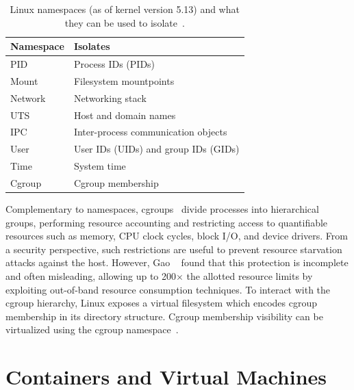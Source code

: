 \begin{table}
\begin{tabular}{lp{3in}}
    \toprule
    Namespace & Isolates \\
    \midrule
    \multirow{1}{*}{PID} & Process IDs (PIDs)\\
    \multirow{1}{*}{Mount} & Filesystem mountpoints\\
    \multirow{1}{*}{Network} & Networking stack\\
    \multirow{1}{*}{UTS} & Host and domain names\\
    \multirow{1}{*}{IPC} & Inter-process communication objects\\
    \multirow{1}{*}{User} & User IDs (UIDs) and group IDs (GIDs)\\
    \multirow{1}{*}{Time} & System time\\
    \multirow{1}{*}{Cgroup} & Cgroup membership\\
    \bottomrule
\end{tabular}
\caption{Linux namespaces (as of kernel version 5.13) and what they can be used to isolate~\cite{linux_namespaces}.}
\label{tab:namespaces}
\end{table}

Complementary to namespaces, cgroups~\cite{cgroups, gao2019_houdini} divide processes into hierarchical
groups, performing resource accounting and restricting access to quantifiable resources
such as memory, CPU clock cycles, block I/O, and device drivers. From a security
perspective, such restrictions are useful to prevent resource starvation attacks against
the host. However, Gao \etal~\cite{gao2019_houdini} found that this protection is
incomplete and often misleading, allowing up to 200$\times$ the allotted resource limits
by exploiting out-of-band resource consumption techniques. To interact with the cgroup hierarchy,
Linux exposes a virtual filesystem which encodes cgroup membership in its directory structure.
Cgroup membership visibility can be virtualized using the cgroup namespace~\cite{cgroups}.



\section{Containers and Virtual Machines}%
\label{s:containers-bg}


